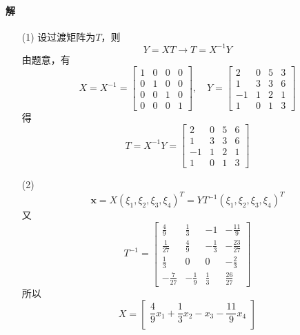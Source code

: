 \documentclass[12pt, a4paper, oneside, fontset=none]{ctexart}
\begin{document}
\paragraph*{解}
\begin{enumerate}
    \item[(1)] 设过渡矩阵为$T$，则
        \[
            Y = XT \rightarrow T = X^{-1}Y
        \]
        由题意，有
        \[
            X = X^{-1} = \begin{bmatrix}
                1 & 0 & 0 & 0 \\
                0 & 1 & 0 & 0 \\
                0 & 0 & 1 & 0 \\
                0 & 0 & 0 & 1
            \end{bmatrix}, \quad Y = \begin{bmatrix}
                2  & 0 & 5 & 3 \\
                1  & 3 & 3 & 6 \\
                -1 & 1 & 2 & 1 \\
                1  & 0 & 1 & 3
            \end{bmatrix}
        \]
        得
        \[
            T = X^{-1}Y = \begin{bmatrix}
                2  & 0 & 5 & 6 \\
                1  & 3 & 3 & 6 \\
                -1 & 1 & 2 & 1 \\
                1  & 0 & 1 & 3
            \end{bmatrix}
        \]
    \item[(2)]
        \[
            \bm{x} = X(\xi_1, \xi_2, \xi_3,\xi_4)^T = YT^{-1}(\xi_1, \xi_2, \xi_3,\xi_4)^T
        \]
        又
        \[
            T^{-1} = \begin{bmatrix}
                \frac{4}{9}   & \frac{1}{3}  & -1           & -\frac{11}{9}  \\
                \frac{1}{27}  & \frac{4}{9}  & -\frac{1}{3} & -\frac{23}{27} \\
                \frac{1}{3}   & 0            & 0            & -\frac{2}{3}   \\
                -\frac{7}{27} & -\frac{1}{9} & \frac{1}{3}  & \frac{26}{27}
            \end{bmatrix}
        \]
        所以
        \[
            X = \begin{bmatrix}
                \dfrac{4}{9}x_1 + \dfrac{1}{3}x_2 -x_3 - \dfrac{11}{9}x_4          \\

\end{bmatrix}\]
\end{enumerate}
\end{document}
